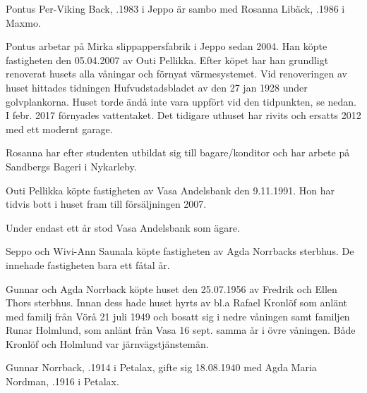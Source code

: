 Pontus Per-Viking Back, .1983 i Jeppo är sambo med Rosanna Libäck, .1986 i Maxmo.
\begin{jhchildren}
  \item {}
  \item {}
\end{jhchildren}

Pontus arbetar på Mirka slippappersfabrik i Jeppo sedan 2004. Han köpte fastigheten den 05.04.2007 av Outi Pellikka. Efter köpet har han grundligt renoverat husets alla våningar och förnyat värmesystemet. Vid renoveringen av huset hittades tidningen Hufvudstadsbladet av	den 27 jan 1928 under golvplankorna. Huset torde ändå inte vara	uppfört vid den tidpunkten, se nedan. I febr. 2017 förnyades vattentaket. Det tidigare uthuset har rivits och ersatts 2012 med ett modernt garage.

Rosanna har efter studenten utbildat sig till bagare/konditor och	har arbete på Sandbergs Bageri i Nykarleby.


%

Outi Pellikka köpte fastigheten av Vasa Andelsbank den 9.11.1991. Hon har tidvis bott i huset fram till försäljningen 2007.\jhvspace{}


%
Under endast ett år stod Vasa Andelsbank som ägare.\jhvspace{}


%
Seppo och Wivi-Ann Saunala köpte fastigheten av Agda Norrbacks sterbhus. De innehade fastigheten bara ett fåtal år.\jhvspace{}


%
Gunnar och Agda Norrback köpte huset den 25.07.1956 av Fredrik och Ellen Thors sterbhus. Innan dess hade huset hyrts av bl.a Rafael Kronlöf som anlänt med familj från Vörå 21 juli 1949 och bosatt sig i	nedre våningen samt familjen Runar Holmlund, som anlänt från Vasa 16 sept. samma år i övre våningen. Både Kronlöf och Holmlund var järnvägstjänstemän.

Gunnar Norrback, .1914 i Petalax, gifte sig 18.08.1940 med Agda Maria Nordman, .1916 i Petalax.
\begin{jhchildren}
  \item {}
  \item {}
\end{jhchildren}

